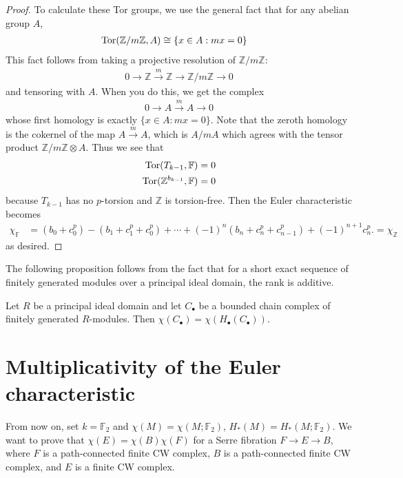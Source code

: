 \documentclass[12pt]{article}
\begin{document}
\begin{proof}
To calculate these Tor groups, we use the general fact that for any abelian group $A$,
\begin{align*}
    \operatorname{Tor}(\mathbb Z/m\mathbb Z, A) & \cong \{x \in A : mx = 0\} 
\end{align*} This fact follows from taking a projective resolution of $\mathbb Z/m\mathbb Z$:
\begin{align*}
    0 \to \mathbb Z \xrightarrow{m} \mathbb Z
    \to \mathbb Z/m\mathbb Z \to 0
\end{align*} and tensoring with $A$. When you do this, we get the complex
\begin{align*}
    0 \to A \xrightarrow{m} A \to 0
\end{align*} whose first homology is exactly $\{x \in A : mx = 0\}$. Note that the zeroth homology is the cokernel of the map $A \xrightarrow{m} A$, which is $A/mA$ which agrees with the tensor product $\mathbb Z/m\mathbb Z \otimes A$. Thus we see that \begin{align*}
    \operatorname{Tor}(T_{k-1},\mathbb F) & = 0 \\
    \operatorname{Tor}(\mathbb Z^{b_{k-1}},\mathbb F) & = 0
\end{align*} because $T_{k-1}$ has no $p$-torsion and 
$\mathbb Z$ is torsion-free.
Then the Euler characteristic becomes
\begin{align*}
\chi_{\mathbb{F}}
&= (b_0 + c_0^p)
- (b_1 + c_1^p + c_0^p)
+ \cdots
+ (-1)^n(b_n + c_n^p + c_{n-1}^p)
+ (-1)^{n+1} c_n^p.
= \chi_{\mathbb{Z}}
\end{align*} as desired.
\end{proof}

The following proposition follows from the fact that for a short exact sequence of finitely generated modules over a principal ideal domain, the rank is additive.

\begin{proposition}
Let $R$ be a principal ideal domain and let $C_\bullet$ be a bounded chain complex of finitely generated $R$-modules.
Then $\chi(C_\bullet) = \chi(H_\bullet(C_\bullet))$.
\end{proposition}

\section{Multiplicativity of the Euler characteristic}
From now on, set $k = \mathbb{F}_2$ and $\chi(M) = \chi(M;\mathbb{F}_2)$, $H_\ast(M) = H_\ast(M;\mathbb{F}_2)$.
We want to prove that $\chi(E) = \chi(B)\chi(F)$ for a Serre fibration $F \to E \to B$,  where $F$ is a path-connected finite CW complex, $B$ is a path-connected finite CW complex, and $E$ is a finite CW complex.
\end{document}
